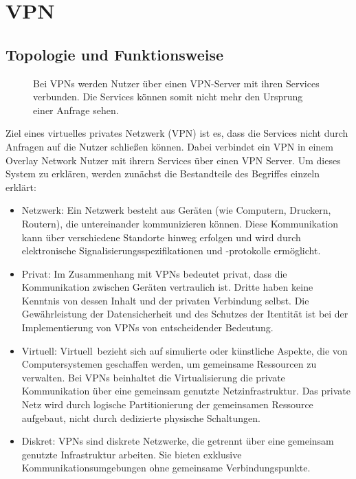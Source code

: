 \section{VPN}
\label{chap:vpn}

\subsection{Topologie und Funktionsweise}
\label{chap:vpn_topology}

\begin{figure}[h!]
    \centering
    
    \caption{Bei VPNs werden Nutzer über einen VPN-Server mit ihren Services verbunden. Die Services können somit nicht mehr den Ursprung einer Anfrage sehen.}
    \label{imgs:vpn}
\end{figure}

Ziel eines virtuelles privates Netzwerk (VPN) ist es, dass die Services nicht durch Anfragen auf die Nutzer schließen können. Dabei verbindet ein VPN in einem Overlay Network Nutzer mit ihrern Services über einen VPN Server. Um dieses System zu erklären, werden zunächst die Bestandteile des Begriffes einzeln erklärt:

\begin{itemize}
    \item Netzwerk: Ein Netzwerk besteht aus Geräten (wie Computern, Druckern, Routern), die untereinander kommunizieren können. Diese Kommunikation kann über verschiedene Standorte hinweg erfolgen und wird durch elektronische Signalisierungsspezifikationen und -protokolle ermöglicht.
    \item Privat: Im Zusammenhang mit VPNs bedeutet \glqq privat\grqq, dass die Kommunikation zwischen Geräten vertraulich ist. Dritte haben keine Kenntnis von dessen Inhalt und der privaten Verbindung selbst. Die Gewährleistung der Datensicherheit und des Schutzes der Itentität ist bei der Implementierung von VPNs von entscheidender Bedeutung.
    \item Virtuell: \glqq Virtuell\grqq\ bezieht sich auf simulierte oder künstliche Aspekte, die von Computersystemen geschaffen werden, um gemeinsame Ressourcen zu verwalten. Bei VPNs beinhaltet die Virtualisierung die private Kommunikation über eine gemeinsam genutzte Netzinfrastruktur. Das private Netz wird durch logische Partitionierung der gemeinsamen Ressource aufgebaut, nicht durch dedizierte physische Schaltungen.
    \item Diskret: VPNs sind diskrete Netzwerke, die getrennt über eine gemeinsam genutzte Infrastruktur arbeiten. Sie bieten exklusive Kommunikationsumgebungen ohne gemeinsame Verbindungspunkte.
\end{itemize}

